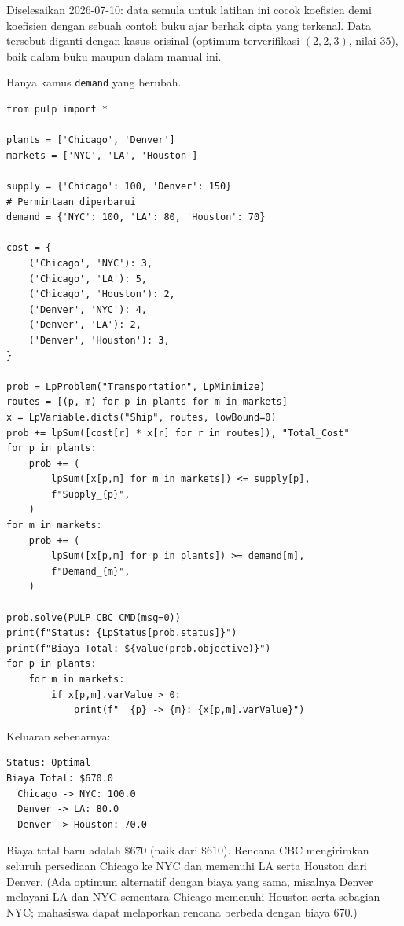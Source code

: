 \begin{qaflag}
Diselesaikan 2026-07-10: data semula untuk latihan ini cocok koefisien demi
koefisien dengan sebuah contoh buku ajar berhak cipta yang terkenal. Data
tersebut diganti dengan kasus orisinal (optimum terverifikasi $(2,2,3)$,
nilai $35$), baik dalam buku maupun dalam manual ini.
\end{qaflag}


Hanya kamus \texttt{demand} yang berubah.

\begin{verbatim}
from pulp import *

plants = ['Chicago', 'Denver']
markets = ['NYC', 'LA', 'Houston']

supply = {'Chicago': 100, 'Denver': 150}
# Permintaan diperbarui
demand = {'NYC': 100, 'LA': 80, 'Houston': 70}

cost = {
    ('Chicago', 'NYC'): 3,
    ('Chicago', 'LA'): 5,
    ('Chicago', 'Houston'): 2,
    ('Denver', 'NYC'): 4,
    ('Denver', 'LA'): 2,
    ('Denver', 'Houston'): 3,
}

prob = LpProblem("Transportation", LpMinimize)
routes = [(p, m) for p in plants for m in markets]
x = LpVariable.dicts("Ship", routes, lowBound=0)
prob += lpSum([cost[r] * x[r] for r in routes]), "Total_Cost"
for p in plants:
    prob += (
        lpSum([x[p,m] for m in markets]) <= supply[p],
        f"Supply_{p}",
    )
for m in markets:
    prob += (
        lpSum([x[p,m] for p in plants]) >= demand[m],
        f"Demand_{m}",
    )

prob.solve(PULP_CBC_CMD(msg=0))
print(f"Status: {LpStatus[prob.status]}")
print(f"Biaya Total: ${value(prob.objective)}")
for p in plants:
    for m in markets:
        if x[p,m].varValue > 0:
            print(f"  {p} -> {m}: {x[p,m].varValue}")
\end{verbatim}

Keluaran sebenarnya:

\begin{verbatim}
Status: Optimal
Biaya Total: $670.0
  Chicago -> NYC: 100.0
  Denver -> LA: 80.0
  Denver -> Houston: 70.0
\end{verbatim}

Biaya total baru adalah $\$670$ (naik dari $\$610$). Rencana CBC mengirimkan
seluruh persediaan Chicago ke NYC dan memenuhi LA serta Houston dari Denver.
(Ada optimum alternatif dengan biaya yang sama, misalnya Denver melayani LA
dan NYC sementara Chicago memenuhi Houston serta sebagian NYC; mahasiswa
dapat melaporkan rencana berbeda dengan biaya $670$.)

